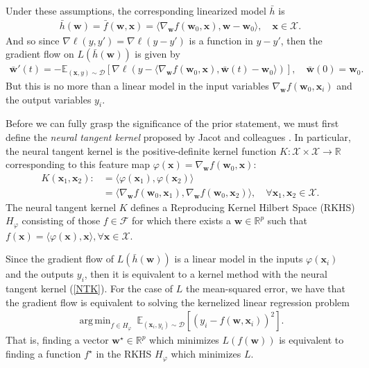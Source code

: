 \documentclass{article}
\DeclareMathOperator*{\argmin}{arg\,min}
\begin{document}
Under these assumptions, the corresponding linearized model $\bar{h}$ is
\begin{align*}
    \bar{h}(\boldsymbol{w}) = \bar{f}(\boldsymbol{w}, \boldsymbol{x}) = \langle \nabla_{\boldsymbol{w}} f(\boldsymbol{w}_0, \boldsymbol{x}), \boldsymbol{w}-\boldsymbol{w}_0\rangle, \quad \boldsymbol{x} \in \mathcal{X}. 
\end{align*}
And so since $\nabla \ell(y, y') = \nabla \ell(y - y')$ is a function in $y - y'$, then the gradient flow on $L(\bar{h}(\boldsymbol{w}))$ is given by
\begin{align*}
    \boldsymbol{\bar{w}}'(t) = - \mathbb{E}_{(\boldsymbol{x}, y) \sim \mathcal{D}}[\nabla \ell(y - \langle \nabla_{\boldsymbol{w}} f(\boldsymbol{w}_0, \boldsymbol{x}), \boldsymbol{\bar{w}}(t)-\boldsymbol{w}_0\rangle)], \quad \boldsymbol{\bar{w}}(0) = \boldsymbol{w}_0.
\end{align*}
But this is no more than a linear model in the input variables $\nabla_{\boldsymbol{w}} f(\boldsymbol{w}_0, \boldsymbol{x}_i)$ and the output variables $y_i$. 

Before we can fully grasp the significance of the prior statement, we must first define the \textit{neural tangent kernel} proposed by Jacot and colleagues \cite{jacot2018neural}. In particular, the neural tangent kernel is the positive-definite kernel function $K: \mathcal{X} \times \mathcal{X} \rightarrow \mathbb{R}$ corresponding to this feature map $\varphi(\boldsymbol{x}) = \nabla_{\boldsymbol{w}} f(\boldsymbol{w}_0, \boldsymbol{x})$:
\begin{align}
    K(\boldsymbol{x}_1, \boldsymbol{x}_2) :&= \langle \varphi(\boldsymbol{x}_1), \varphi(\boldsymbol{x}_2) \rangle \nonumber \\
    &= \langle \nabla_{\boldsymbol{w}} f(\boldsymbol{w}_0, \boldsymbol{x}_1), \nabla_{\boldsymbol{w}} f(\boldsymbol{w}_0, \boldsymbol{x}_2) \rangle, \quad \forall \boldsymbol{x}_1, \boldsymbol{x}_2 \in \mathcal{X}\label{NTK}.
\end{align}
The neural tangent kernel $K$ defines a Reproducing Kernel Hilbert Space (RKHS) $H_{\varphi}$ consisting of those $f \in \mathcal{F}$ for which there exists a  $\boldsymbol{w} \in \mathbb{R}^p$ such that $f(\boldsymbol{x}) = \langle \varphi(\boldsymbol{x}), \boldsymbol{x} \rangle, \forall \boldsymbol{x} \in \mathcal{X}$. 

Since the gradient flow of $L(\bar{h}(\boldsymbol{w}))$ is a linear model in the inputs $\varphi(\boldsymbol{x}_i)$ and the outputs $y_i$, then it is equivalent to a kernel method with the neural tangent kernel (\ref{NTK}). For the case of $L$ the mean-squared error, we have that the gradient flow is equivalent to solving the kernelized linear regression problem
\begin{align*}
    \argmin_{f \in H_{\varphi}} \ \mathbb{E}_{(\boldsymbol{x}_i, y_i) \sim \mathcal{D}}\left[(y_i - f(\boldsymbol{w}, \boldsymbol{x}_i))^2 \right].
\end{align*}
That is, finding a vector $\boldsymbol{w}^{\star} \in \mathbb{R}^p$ which minimizes $L(f(\boldsymbol{w}))$ is equivalent to finding a function $f^{\star}$ in the RKHS $H_{\varphi}$ which minimizes $L$.
\end{document}
